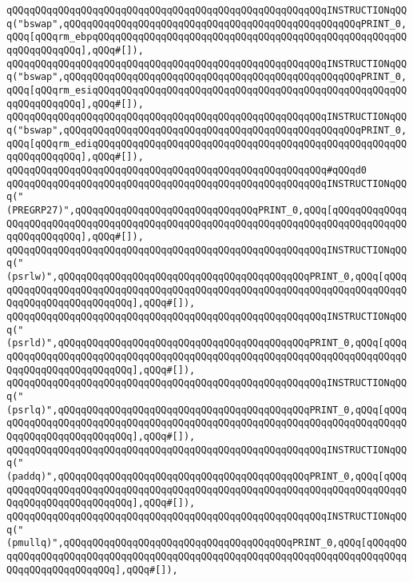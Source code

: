 \verb|qQQqqQQqqQQqqQQqqQQqqQQqqQQqqQQqqQQqqQQqqQQqqQQqqQQqqQQqINSTRUCTIONqQQq("bswap",qQQqqQQqqQQqqQQqqQQqqQQqqQQqqQQqqQQqqQQqqQQqqQQqqQQqPRINT_0,qQQq[qQQqrm_ebpqQQqqQQqqQQqqQQqqQQqqQQqqQQqqQQqqQQqqQQqqQQqqQQqqQQqqQQqqQQqqQQqqQQq],qQQq#[]),|\newline
\verb|qQQqqQQqqQQqqQQqqQQqqQQqqQQqqQQqqQQqqQQqqQQqqQQqqQQqqQQqINSTRUCTIONqQQq("bswap",qQQqqQQqqQQqqQQqqQQqqQQqqQQqqQQqqQQqqQQqqQQqqQQqqQQqPRINT_0,qQQq[qQQqrm_esiqQQqqQQqqQQqqQQqqQQqqQQqqQQqqQQqqQQqqQQqqQQqqQQqqQQqqQQqqQQqqQQqqQQq],qQQq#[]),|\newline
\verb|qQQqqQQqqQQqqQQqqQQqqQQqqQQqqQQqqQQqqQQqqQQqqQQqqQQqqQQqINSTRUCTIONqQQq("bswap",qQQqqQQqqQQqqQQqqQQqqQQqqQQqqQQqqQQqqQQqqQQqqQQqqQQqPRINT_0,qQQq[qQQqrm_ediqQQqqQQqqQQqqQQqqQQqqQQqqQQqqQQqqQQqqQQqqQQqqQQqqQQqqQQqqQQqqQQqqQQq],qQQq#[]),|\newline
\verb|qQQqqQQqqQQqqQQqqQQqqQQqqQQqqQQqqQQqqQQqqQQqqQQqqQQqqQQq#qQQqd0|\newline
\verb|qQQqqQQqqQQqqQQqqQQqqQQqqQQqqQQqqQQqqQQqqQQqqQQqqQQqqQQqINSTRUCTIONqQQq("(PREGRP27)",qQQqqQQqqQQqqQQqqQQqqQQqqQQqqQQqPRINT_0,qQQq[qQQqqQQqqQQqqQQqqQQqqQQqqQQqqQQqqQQqqQQqqQQqqQQqqQQqqQQqqQQqqQQqqQQqqQQqqQQqqQQqqQQqqQQqqQQqqQQq],qQQq#[]),|\newline
\verb|qQQqqQQqqQQqqQQqqQQqqQQqqQQqqQQqqQQqqQQqqQQqqQQqqQQqqQQqINSTRUCTIONqQQq("(psrlw)",qQQqqQQqqQQqqQQqqQQqqQQqqQQqqQQqqQQqqQQqqQQqPRINT_0,qQQq[qQQqqQQqqQQqqQQqqQQqqQQqqQQqqQQqqQQqqQQqqQQqqQQqqQQqqQQqqQQqqQQqqQQqqQQqqQQqqQQqqQQqqQQqqQQqqQQq],qQQq#[]),|\newline
\verb|qQQqqQQqqQQqqQQqqQQqqQQqqQQqqQQqqQQqqQQqqQQqqQQqqQQqqQQqINSTRUCTIONqQQq("(psrld)",qQQqqQQqqQQqqQQqqQQqqQQqqQQqqQQqqQQqqQQqqQQqPRINT_0,qQQq[qQQqqQQqqQQqqQQqqQQqqQQqqQQqqQQqqQQqqQQqqQQqqQQqqQQqqQQqqQQqqQQqqQQqqQQqqQQqqQQqqQQqqQQqqQQqqQQq],qQQq#[]),|\newline
\verb|qQQqqQQqqQQqqQQqqQQqqQQqqQQqqQQqqQQqqQQqqQQqqQQqqQQqqQQqINSTRUCTIONqQQq("(psrlq)",qQQqqQQqqQQqqQQqqQQqqQQqqQQqqQQqqQQqqQQqqQQqPRINT_0,qQQq[qQQqqQQqqQQqqQQqqQQqqQQqqQQqqQQqqQQqqQQqqQQqqQQqqQQqqQQqqQQqqQQqqQQqqQQqqQQqqQQqqQQqqQQqqQQqqQQq],qQQq#[]),|\newline
\verb|qQQqqQQqqQQqqQQqqQQqqQQqqQQqqQQqqQQqqQQqqQQqqQQqqQQqqQQqINSTRUCTIONqQQq("(paddq)",qQQqqQQqqQQqqQQqqQQqqQQqqQQqqQQqqQQqqQQqqQQqPRINT_0,qQQq[qQQqqQQqqQQqqQQqqQQqqQQqqQQqqQQqqQQqqQQqqQQqqQQqqQQqqQQqqQQqqQQqqQQqqQQqqQQqqQQqqQQqqQQqqQQqqQQq],qQQq#[]),|\newline
\verb|qQQqqQQqqQQqqQQqqQQqqQQqqQQqqQQqqQQqqQQqqQQqqQQqqQQqqQQqINSTRUCTIONqQQq("(pmullq)",qQQqqQQqqQQqqQQqqQQqqQQqqQQqqQQqqQQqqQQqPRINT_0,qQQq[qQQqqQQqqQQqqQQqqQQqqQQqqQQqqQQqqQQqqQQqqQQqqQQqqQQqqQQqqQQqqQQqqQQqqQQqqQQqqQQqqQQqqQQqqQQqqQQq],qQQq#[]),|\newline

